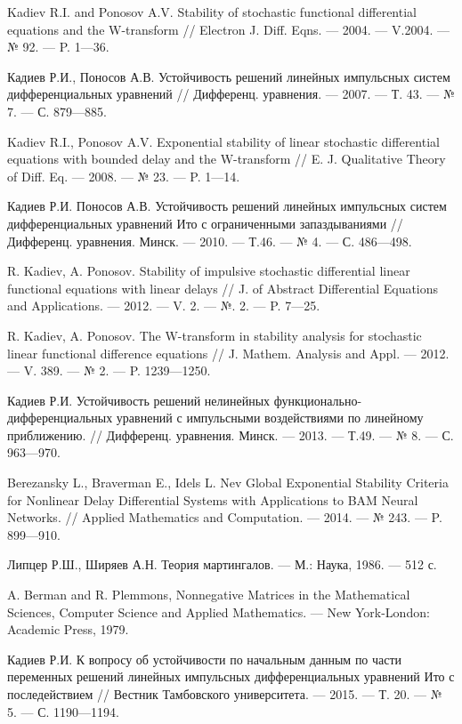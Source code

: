 \begin{thebibliography}{111}
	Kadiev R.I. and Ponosov A.V. Stability of stochastic functional differential equations and the W-transform // Electron J. Diff. Eqns. --- 2004. --- V.2004. --- № 92. --- P. 1---36.
	
	Кадиев Р.И., Поносов А.В. Устойчивость решений линейных импульсных систем дифференциальных уравнений // Дифференц. уравнения. --- 2007. --- Т. 43. --- № 7. --- С. 879---885.
	
	Kadiev R.I., Ponosov A.V. Exponential stability of linear stochastic differential equations with bounded delay and the W-transform // E. J. Qualitative Theory of Diff. Eq. --- 2008. --- № 23. --- P. 1---14.
	
	Кадиев Р.И. Поносов А.В. Устойчивость решений линейных импульсных систем дифференциальных уравнений Ито с ограниченными запаздываниями // Дифференц. уравнения. Минск. --- 2010. --- Т.46. --- № 4. --- С. 486---498.
	
	R. Kadiev, A. Ponosov. Stability of impulsive stochastic differential linear functional	equations with linear delays // J. of Abstract Differential Equations and Applications. --- 2012. --- V. 2. --- №. 2. --- P. 7---25.
	
	R. Kadiev, A. Ponosov. The W-transform in stability analysis for stochastic linear functional difference equations // J. Mathem. Analysis and Appl. --- 2012. --- V. 389. --- № 2. --- P. 1239---1250.
	
	Кадиев Р.И. Устойчивость решений нелинейных функционально-дифференциальных уравнений с импульсными воздействиями по линейному приближению. // Дифференц. уравнения. Минск. --- 2013. --- Т.49. --- № 8. --- С. 963---970.
	
	Berezansky L., Braverman E., Idels L. Nev Global Exponential Stability Criteria for	Nonlinear Delay Differential Systems with Applications to BAM Neural Networks. // Applied Mathematics and Computation. --- 2014. --- № 243. --- P. 899---910.
	
	Липцер Р.Ш., Ширяев А.Н. Теория мартингалов. --- М.: Наука, 1986. --- 512 с.
	
	A. Berman and R. Plemmons, Nonnegative Matrices in the Mathematical Sciences, Computer Science and Applied Mathematics. --- New York-London: Academic Press, 1979.
	
	Кадиев Р.И. К вопросу об устойчивости по начальным данным по части переменных решений линейных импульсных	дифференциальных уравнений Ито с последействием // Вестник Тамбовского университета. --- 2015. --- Т. 20. --- № 5. --- С. 1190---1194.
	

\end{thebibliography}
